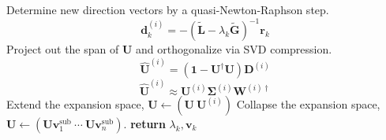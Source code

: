 \begin{algorithm}
\begin{algorithmic}[1]
            \EndIf
            \State
            Determine new direction vectors by a quasi-Newton-Raphson step.
            \[
                \mathbf{d}_k^{(i)}
                =
                -
                (
                    \tilde{\mathbf{L}}
                    -
                    \lambda_k
                    \tilde{\mathbf{G}}
                )^{-1}
                \mathbf{r}_k
            \]
            \State
            Project out the span of \(\mathbf{U}\) and orthogonalize via
            SVD compression.
            \[
                \widehat{\mathbf{U}}^{(i)}
                =
                (\mathbf{1} - \mathbf{U}^\dagger \mathbf{U})
                \mathbf{D}^{(i)}
            \]
            \[
                \widehat{\mathbf{U}}^{(i)}
                \approx
                \mathbf{U}^{(i)}
                \mathbf{\Sigma}^{(i)}
                \mathbf{W}^{(i)\dagger}
            \]
                \State
                Extend the expansion space,
                \(
                    \mathbf{U}
                    \leftarrow
                    (\mathbf{U}\ \mathbf{U}^{(i)})
                \)
            \Else
                \State
                Collapse the expansion space,
                \(
                    \mathbf{U}
                    \leftarrow
                    (
                        \mathbf{U}
                        \mathbf{v}_1^\mathrm{sub}\ 
                        \cdots\ 
                        \mathbf{U}
                        \mathbf{v}_n^\mathrm{sub}
                    )
                \).
            \EndIf
        \EndFor
        \State
        {\bfseries return}
        \(
            \lambda_k,
            \mathbf{v}_k
        \)
        \EndProcedure
    \end{algorithmic}
\end{algorithm}

